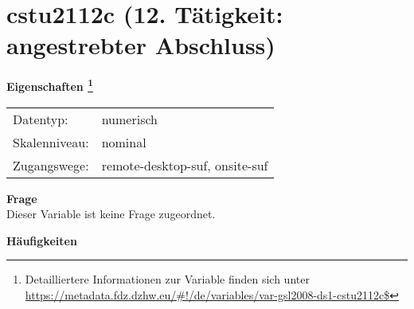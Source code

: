 
    \setcounter{footnote}{0}

    \vspace*{-1.8cm}
	\section{cstu2112c (12. Tätigkeit: angestrebter Abschluss)}
	\label{section:cstu2112c}



    \vspace*{0.5cm}
    \noindent\textbf{Eigenschaften
	\footnote{Detailliertere Informationen zur Variable finden sich unter
		\url{https://metadata.fdz.dzhw.eu/\#!/de/variables/var-gsl2008-ds1-cstu2112c$}}}\\
	\begin{tabularx}{\hsize}{@{}lX}
	Datentyp: & numerisch \\
	Skalenniveau: & nominal \\
	Zugangswege: &
	  remote-desktop-suf, 
	  onsite-suf
 \\
    \end{tabularx}



		\vspace*{0.5cm}
		\noindent\textbf{Frage}\\
		Dieser Variable ist keine Frage zugeordnet.





        		\vspace*{0.5cm}
                \noindent\textbf{Häufigkeiten}

